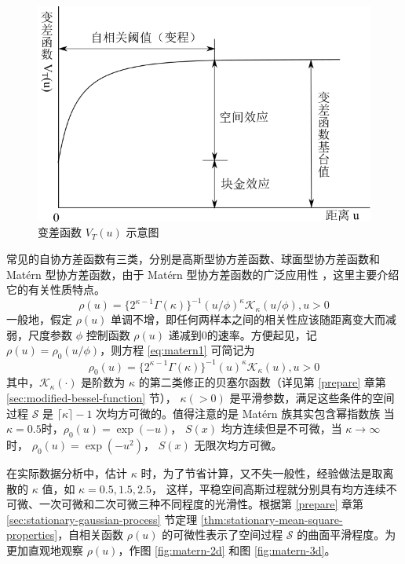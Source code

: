 \documentclass[12pt,a4paper,UTF8,twoside]{book}
\theoremstyle{definition}
\theoremstyle{definition}
\theoremstyle{definition}
\theoremstyle{remark}
\begin{document}
\begin{figure}

{\centering \includegraphics[width=0.7\linewidth]{figures/semi-variance} 

}

\caption{变差函数 $V_{T}(u)$ 示意图}\label{fig:semi-variance}
\end{figure}

常见的自协方差函数有三类，分别是高斯型协方差函数、球面型协方差函数和
Matérn 型协方差函数，由于 Matérn 型协方差函数的广泛应用性
\citep{Diggle1998, Diggle2002Childhood, Christensen2004}，这里主要介绍它的有关性质特点。
\begin{equation}
\rho(u)=\{2^{\kappa -1}\Gamma(\kappa)\}^{-1}(u/\phi)^{\kappa}\mathcal{K}_{\kappa}(u/\phi),u > 0 \label{eq:matern1}
\end{equation} \noindent 一般地，假定 \(\rho(u)\)
单调不增，即任何两样本之间的相关性应该随距离变大而减弱，尺度参数
\(\phi\) 控制函数 \(\rho(u)\) 递减到0的速率。方便起见，记
\(\rho(u) = \rho_{0}(u/\phi)\)，则方程 \eqref{eq:matern1} 可简记为
\begin{equation}
\rho_{0}(u)=\{2^{\kappa -1}\Gamma(\kappa)\}^{-1}(u)^{\kappa}\mathcal{K}_{\kappa}(u),u > 0 \label{eq:matern2}
\end{equation} \noindent 其中，\(\mathcal{K}_{\kappa}(\cdot)\) 是阶数为
\(\kappa\) 的第二类修正的贝塞尔函数（详见第 \ref{prepare}
章第\ref{sec:modified-bessel-function} 节）， \(\kappa(>0)\)
是平滑参数，满足这些条件的空间过程 \(\mathcal{S}\) 是
\(\lceil\kappa\rceil-1\) 次均方可微的。值得注意的是 Matérn
族其实包含幂指数族 \noindent 当
\(\kappa = 0.5\)时，\(\rho_{0}(u) = \exp(-u)\)， \(S(x)\)
均方连续但是不可微，当 \(\kappa \to \infty\) 时，
\(\rho_{0}(u) = \exp(-u^2)\)， \(S(x)\)
无限次均方可微\citep{Diggle2007}。

在实际数据分析中，估计 \(\kappa\)
时，为了节省计算，又不失一般性，经验做法是取离散的 \(\kappa\) 值，如
\(\kappa = 0.5, 1.5, 2.5\)，
这样，平稳空间高斯过程就分别具有均方连续不可微、一次可微和二次可微三种不同程度的光滑性。根据第
\ref{prepare} 章第 \ref{sec:stationary-gaussian-process} 节定理
\ref{thm:stationary-mean-square-properties}，自相关函数 \(\rho(u)\)
的可微性表示了空间过程 \(\mathcal{S}\) 的曲面平滑程度。为更加直观地观察
\(\rho(u)\)，作图 \ref{fig:matern-2d} 和图 \ref{fig:matern-3d}。
\end{document}
